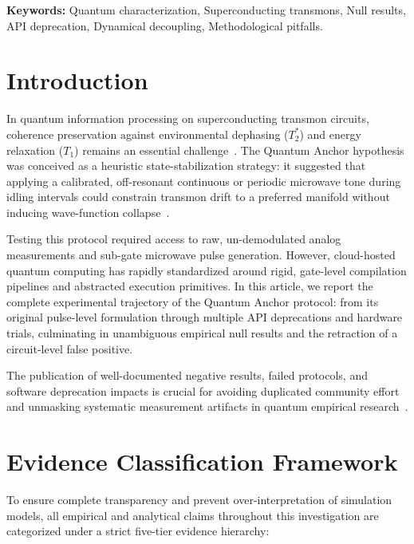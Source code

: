 \documentclass[11pt,a4paper]{article}
\begin{document}
\vspace{1em}
\noindent \textbf{Keywords:} Quantum characterization, Superconducting transmons, Null results, API deprecation, Dynamical decoupling, Methodological pitfalls.

\section{Introduction}

In quantum information processing on superconducting transmon circuits, coherence preservation against environmental dephasing ($T_2^*$) and energy relaxation ($T_1$) remains an essential challenge~\cite{transmon_coherence,blais_cqed,koch2007transmon}. The Quantum Anchor hypothesis was conceived as a heuristic state-stabilization strategy: it suggested that applying a calibrated, off-resonant continuous or periodic microwave tone during idling intervals could constrain transmon drift to a preferred manifold without inducing wave-function collapse~\cite{dynamical_decoupling,viola1998dd}.

Testing this protocol required access to raw, un-demodulated analog measurements and sub-gate microwave pulse generation. However, cloud-hosted quantum computing has rapidly standardized around rigid, gate-level compilation pipelines and abstracted execution primitives. In this article, we report the complete experimental trajectory of the Quantum Anchor protocol: from its original pulse-level formulation through multiple API deprecations and hardware trials, culminating in unambiguous empirical null results and the retraction of a circuit-level false positive.

The publication of well-documented negative results, failed protocols, and software deprecation impacts is crucial for avoiding duplicated community effort and unmasking systematic measurement artifacts in quantum empirical research~\cite{jote_aims}.

\section{Evidence Classification Framework}

To ensure complete transparency and prevent over-interpretation of simulation models, all empirical and analytical claims throughout this investigation are categorized under a strict five-tier evidence hierarchy:
\end{document}
